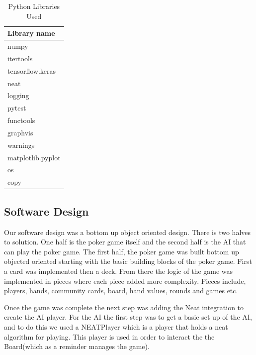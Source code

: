 \begin{table}[H]
    \caption{Python Libraries Used}
    \centering
    \begin{tabular}{ | l |}
    \hline
        Library name \\
        \hline
        \hline
        numpy \\
        itertools \\
        tensorflow.keras \\
        neat \\
        logging \\
        pytest \\
        functools \\
        graphvis \\
        warnings \\
        matplotlib.pyplot \\
        os \\
        copy \\
        
    \hline
    \end{tabular}
    \label{tab:libs}
\end{table}

\subsection{Software Design}
Our software design was a bottom up object oriented design. There is two halves to solution. One half is the poker game itself and the second half is the AI that can play the poker game. The first half, the poker game was built bottom up objected oriented starting with the basic building blocks of the poker game. First a card was implemented then a deck. From there the logic of the game was implemented in pieces where each piece added more complexity. Pieces include, players, hands, community cards, board, hand values, rounds and games etc. 

Once the game was complete the next step was adding the Neat integration to create the AI player. For the AI
the first step was to get a basic set up of the AI, and to do this we used a NEATPlayer which is a player that
holds a neat algorithm for playing. This player is used in order to interact the the Board(which as a reminder
manages the game).


